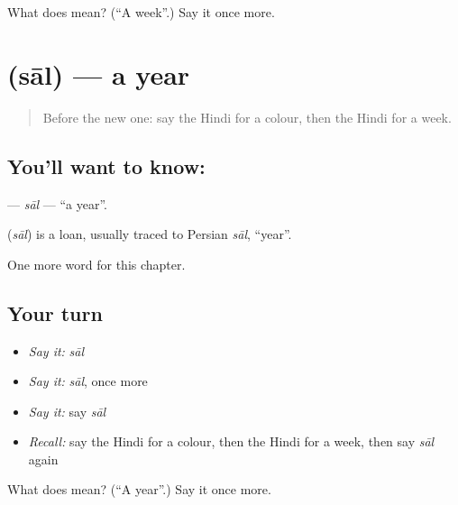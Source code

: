 \begin{tcolorbox}[breakable,colback=teal!4,colframe=teal!35!black,title={Before you move on}]
What does  mean? (\textquotedblleft{}A week\textquotedblright{}.) Say it once more.
\end{tcolorbox}
\section[\texorpdfstring{\hi{साल} (sāl)}{साल (sāl)}]{ (sāl) — a year}

\label{lesson:HI-C191-sal}



\begin{quote}
Before the new one: say the Hindi for a colour, then the Hindi for a week.
\end{quote}

\subsection*{You'll want to know: }
\textbf{} — \emph{sāl} — \textquotedblleft{}a year\textquotedblright{}.

\begin{cousinweb}
\textbf{} (\emph{sāl}) is a loan, usually traced to Persian \emph{sāl}, \textquotedblleft{}year\textquotedblright{}.
\end{cousinweb}

\begin{grammarlens}[title={What you've built}]
One more word for this chapter.
\end{grammarlens}

\subsection*{Your turn}
\begin{itemize}
\raggedright
  \item \emph{Say it:} \emph{sāl}
  \item \emph{Say it:} \emph{sāl}, once more
  \item \emph{Say it:} say \emph{sāl}
  \item \emph{Recall:} say the Hindi for a colour, then the Hindi for a week, then say \emph{sāl} again
\end{itemize}

\begin{tcolorbox}[breakable,colback=teal!4,colframe=teal!35!black,title={Before you move on}]
What does  mean? (\textquotedblleft{}A year\textquotedblright{}.) Say it once more.
\end{tcolorbox}
